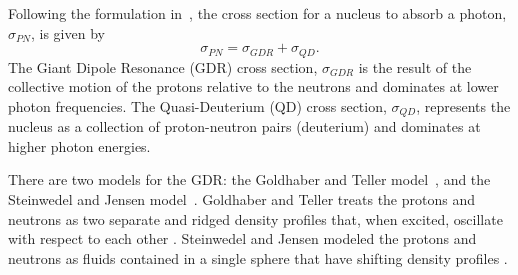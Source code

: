     Following the formulation in~\cite{emPCite4}, the cross section for a
      nucleus to absorb a photon, $\sigma_{PN}$, is given by 
      \begin{equation}
        \sigma_{PN}=\sigma_{GDR}+\sigma_{QD}.
        \label{eq:photoNucDis}
      \end{equation}
    The Giant Dipole Resonance (GDR) cross section, $\sigma_{GDR}$ is the result
      of the collective motion of the protons relative to the neutrons and 
      dominates at lower photon frequencies.
    The Quasi-Deuterium (QD) cross section, $\sigma_{QD}$, represents the 
      nucleus as a collection of proton-neutron pairs (deuterium) and dominates 
      at higher photon energies.

    There are two models for the GDR: the Goldhaber and Teller model~\cite{Goldhaber:1948zza}, and the 
      Steinwedel and Jensen model~\cite{Jensen:1950}.
    Goldhaber and Teller treats the protons and neutrons as two separate and 
      ridged density profiles that, when excited, oscillate with respect to 
      each other \cite{emPCite6}.
    Steinwedel and Jensen modeled the protons and neutrons as fluids contained 
      in a single sphere that have shifting density profiles \cite{emPCite6}.

